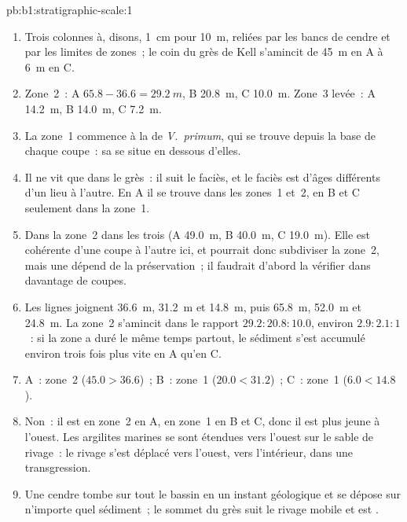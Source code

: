 \begin{solution}{pb:b1:stratigraphic-scale:1}
\begin{enumerate}
  \item Trois colonnes à, disons, \qty{1}{cm} pour \qty{10}{m}, reliées par les bancs de cendre
        et par les limites de zones~; le coin du grès de Kell s'amincit de
        \qty{45}{m} en A à \qty{6}{m} en C.
  \item Zone~2~: A $65.8 - 36.6 = \qty{29.2}{m}$, B \qty{20.8}{m}, C
        \qty{10.0}{m}. Zone~3 levée~: A \qty{14.2}{m}, B \qty{14.0}{m}, C
        \qty{7.2}{m}.
  \item La zone~1 commence à la  de \emph{V.~primum}, qui se trouve
        depuis la base de chaque coupe~: sa  se situe en dessous d'elles.
  \item Il ne vit que dans le grès~: il suit le faciès, et le faciès
        est d'âges différents d'un lieu à l'autre. En A il se trouve dans les zones~1
        et~2, en B et C seulement dans la zone~1.
  \item Dans la zone~2 dans les trois (A \qty{49.0}{m}, B \qty{40.0}{m}, C
        \qty{19.0}{m}). Elle est cohérente d'une coupe à l'autre ici, et pourrait donc
        subdiviser la zone~2, mais une  dépend de la préservation~;
        il faudrait d'abord la vérifier dans davantage de coupes.
  \item Les lignes joignent \qty{36.6}{m}, \qty{31.2}{m} et \qty{14.8}{m}, puis
        \qty{65.8}{m}, \qty{52.0}{m} et \qty{24.8}{m}. La zone~2 s'amincit dans le
        rapport $29.2 : 20.8 : 10.0$, environ $2.9 : 2.1 : 1$~: si la zone a duré
        le même temps partout, le sédiment s'est accumulé environ trois fois plus
        vite en A qu'en C.
  \item A~: zone~2 ($45.0 > 36.6$)~; B~: zone~1 ($20.0 < 31.2$)~; C~: zone~1
        ($6.0 < 14.8$).
  \item Non~: il est en zone~2 en A, en zone~1 en B et C, donc il est plus jeune à
        l'ouest. Les argilites marines se sont étendues vers l'ouest sur le sable de rivage~: le
        rivage s'est déplacé vers l'ouest, vers l'intérieur, dans une transgression.
  \item Une cendre tombe sur tout le bassin en un instant géologique et se dépose
        sur n'importe quel sédiment~; le sommet du grès suit le rivage mobile
        et est .

\end{enumerate}
\end{solution}
